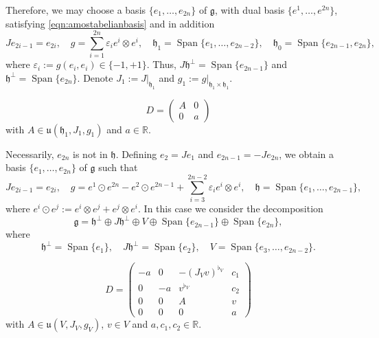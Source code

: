 \documentclass[10pt,a4paper]{amsart}
\newcommand{\R}{\mathbb{R}}
\newcommand{\Span}[1]{\operatorname{Span}\{#1\}}
\newcommand{\frg}{\mathfrak{g}}
\newcommand{\frh}{\mathfrak{h}}
\newcommand{\lie}[1]{\mathfrak{#1}}
\begin{document}
Therefore, we may choose a basis $\{e_1,\dotsc, e_{2n}\}$ of $\frg$, with dual basis $\{e^1,\dotsc, e^{2n}\}$, satisfying \eqref{eqn:amostabelianbasis} and in addition \begin{equation}\label{eq:non-isotropic_pseudo-Hermitian}
    Je_{2i-1}=e_{2i}, \quad g=\sum_{i=1}^{2n}\varepsilon_i e^i\otimes e^i, \quad \lie h_1=\Span{e_1,\dotsc, e_{2n-2}}, \quad \lie h_0=\Span{e_{2n-1},e_{2n}},
\end{equation} where $\varepsilon_i:=g(e_i,e_i)\in\{-1,+1\}$. Thus, $J\frh^\perp=\Span{e_{2n-1}}$ and $\frh^\perp=\Span{e_{2n}}$. Denote $J_1:=J|_{\frh_1}$ and $g_1:=g|_{\frh_1\times\frh_1}$.

    \begin{equation}\label{eq:D_positive_g0}
        D=\begin{pmatrix}
            A&0\\
            0&a
        \end{pmatrix}
    \end{equation} with $A\in\mathfrak{u}(\frh_1,J_1,g_1)$ and $a\in\R$.

Necessarily, $e_{2n}$ is not in $\lie h$. Defining $e_2=Je_1$ and $e_{2n-1}=-Je_{2n}$, we obtain a basis $\{e_1,\dotsc, e_{2n}\}$ of $\frg$ such that \begin{equation}\label{eqn:almosthermitianstructurezero}
    Je_{2i-1}=e_{2i}, \quad g=e^1\odot e^{2n}-e^2\odot e^{2n-1}+\sum_{i=3}^{2n-2}\varepsilon_i e^i\otimes e^i, \quad \lie h=\Span{e_1,\dotsc, e_{2n-1}},
\end{equation} where $e^i\odot e^j:=e^i\otimes e^j+e^j\otimes e^i$. In this case we consider the decomposition $$\frg=\frh^\perp\oplus J\frh^\perp\oplus V\oplus\Span{e_{2n-1}}\oplus\Span{e_{2n}},$$ where $$\frh^\perp=\Span{e_1},\quad J\frh^\perp=\Span{e_2},\quad V=\Span{e_3,\ldots,e_{2n-2}}.$$

    \begin{equation}\label{eq:D_zero_g0}
        D=\begin{pmatrix}
            -a&0&-(J_Vv)^{\flat_V}&c_1\\
            0&-a&v^{\flat_V}&c_2\\
            0&0&A&v\\
            0&0&0&a
        \end{pmatrix}
    \end{equation} with $A\in\mathfrak{u}(V,J_V,g_V)$, $v\in V$ and $a,c_1,c_2\in\R$.
\end{document}
